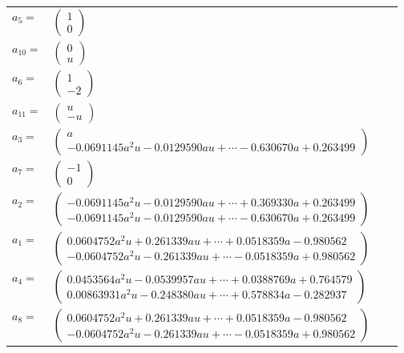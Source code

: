 \documentclass[1p]{elsarticle_modified}
\theoremstyle{definition}
\begin{document}
\begin{tabular}{m{7pt} m{180pt} m{7pt} m{180pt} }
\flushright $a_{5}=$&$\begin{pmatrix}1\\0\end{pmatrix}$ \\
\flushright $a_{10}=$&$\begin{pmatrix}0\\u\end{pmatrix}$ \\
\flushright $a_{6}=$&$\begin{pmatrix}1\\-2\end{pmatrix}$ \\
\flushright $a_{11}=$&$\begin{pmatrix}u\\- u\end{pmatrix}$ \\
\flushright $a_{3}=$&$\begin{pmatrix}a\\-0.0691145 a^{2} u-0.0129590 a u+\cdots-0.630670 a+0.263499\end{pmatrix}$ \\
\flushright $a_{7}=$&$\begin{pmatrix}-1\\0\end{pmatrix}$ \\
\flushright $a_{2}=$&$\begin{pmatrix}-0.0691145 a^{2} u-0.0129590 a u+\cdots+0.369330 a+0.263499\\-0.0691145 a^{2} u-0.0129590 a u+\cdots-0.630670 a+0.263499\end{pmatrix}$ \\
\flushright $a_{1}=$&$\begin{pmatrix}0.0604752 a^{2} u+0.261339 a u+\cdots+0.0518359 a-0.980562\\-0.0604752 a^{2} u-0.261339 a u+\cdots-0.0518359 a+0.980562\end{pmatrix}$ \\
\flushright $a_{4}=$&$\begin{pmatrix}0.0453564 a^{2} u-0.0539957 a u+\cdots+0.0388769 a+0.764579\\0.00863931 a^{2} u-0.248380 a u+\cdots+0.578834 a-0.282937\end{pmatrix}$ \\
\flushright $a_{8}=$&$\begin{pmatrix}0.0604752 a^{2} u+0.261339 a u+\cdots+0.0518359 a-0.980562\\-0.0604752 a^{2} u-0.261339 a u+\cdots-0.0518359 a+0.980562\end{pmatrix}$ \\

\end{tabular}
\end{document}
